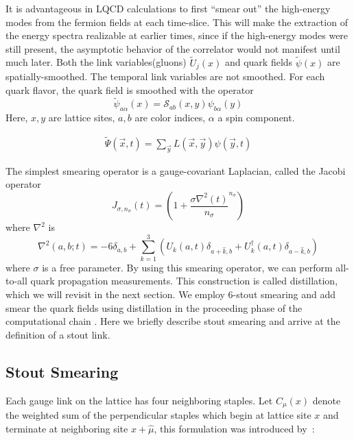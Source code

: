 It is advantageous in LQCD calculations to first ``smear out'' the high-energy modes from the fermion fields at each time-slice. This will make the extraction of the energy spectra realizable at earlier times, since if the high-energy modes were still present, the asymptotic behavior of the correlator would not manifest until much later. 
Both the link variables(gluons) $\tilde{U}_j(x)$ and quark fields $\tilde{\psi}(x)$ are spatially-smoothed. The temporal link variables are not smoothed. For each quark flavor, the quark field is smoothed with the operator
\begin{equation}
    \tilde{\psi}_{a\alpha}(x) = \mathcal{S}_{ab}(x,y) \psi_{b\alpha}(y)
\end{equation}
Here, $x,y$ are lattice sites, $a,b$ are color indices, $\alpha$ a spin component. 

\begin{align}
    \tilde{\Psi}(\vec{x},t) = \sum_{\vec{y}} L(\vec{x},\vec{y})\psi(\vec{y},t)
\end{align}

The simplest smearing operator is a gauge-covariant Laplacian, called the Jacobi operator \cite{peardon_novel_2009} 
\begin{equation}
    J_{\sigma,n_\sigma}(t) = \left(1 + \frac{\sigma\nabla^2(t)}{n_\sigma}^{n_\sigma}\right)
\end{equation} where $\nabla^2$ is \cite{10.5555/3029317}
\begin{equation}\label{eq:laplace}
    \nabla^2(a,b;t) =  -6\delta_{a,b} + \sum_{k=1}^{3} \left(U_k(a,t)\delta_{a+\hat{k},b} + U_k^{\dagger}(a,t)\delta_{a-\hat{k},b}\right)
\end{equation}
where $\sigma$ is a free parameter. 
By using this smearing operator, we can perform all-to-all quark propagation measurements. This construction is called distillation, which we will revisit in the next section.  
We employ 6-stout smearing \cite{stout} and add smear the quark fields using distillation in the proceeding phase of the computational chain \cite{peardon_novel_2009}. Here we briefly describe stout smearing and arrive at the definition of a stout link. 

\subsection{Stout Smearing}
Each gauge link on the lattice has four neighboring staples. 
Let $C_\mu(x)$ denote the weighted sum of the perpendicular staples which
begin at lattice site $x$ and terminate at neighboring site 
$x\!+\!\hat{\mu}$, this formulation was introduced by~\cite{stout}:

